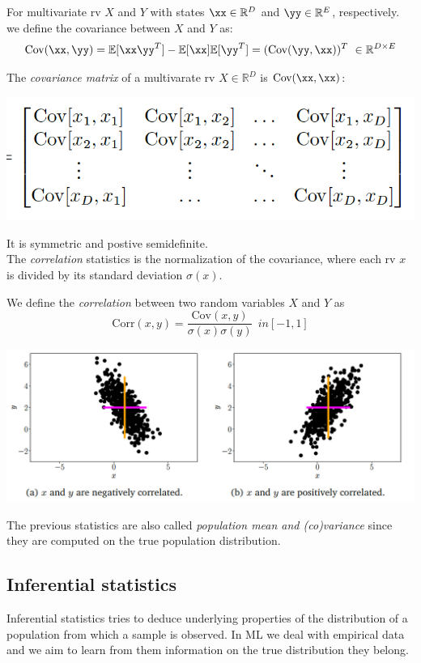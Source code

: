  For multivariate rv $X$ and $Y$ with states $\xx \in \mathbb{R}^D$ and $\yy \in \mathbb{R}^E$, respectively. we define the covariance between $X$ and $Y$ as:
 $$\text{Cov}(\xx, \yy) = \mathbb{E}[\xx\yy^T]-\mathbb{E}[\xx]\mathbb{E}[\yy^T]=(\text{Cov}(\yy, \xx))^T \ \in \mathbb{R}^{D \times E}$$
 
 The \textit{covariance matrix} of a multivarate rv $X \in \mathbb{R}^D$ is $\text{Cov}(\xx, \xx)$:
 
 \includegraphics[width=0.6 \textwidth]{sections/images/prob1.png}
 
 It is symmetric and postive semidefinite. \\
 The \textit{correlation} statistics is the normalization of the covariance, where each rv $x$ is divided by its standard deviation $\sigma(x)$.

 \begin{definition}
     We define the \textit{correlation} between two random variables $X$ and $Y$ as
     $$ \text{Corr}(x, y) = \frac{\text{Cov}(x, y)}{\sigma(x)\sigma(y)} \ \ in [-1,1]$$
 \end{definition}

\includegraphics[width=0.6 \textwidth]{sections/images/prob2.png}




The previous statistics are also called \textit{population mean and (co)variance} since they are computed on the true population distribution.

 \subsection{Inferential statistics}
 Inferential statistics tries to deduce underlying properties of the distribution of a population from which a sample is observed. In ML we deal with empirical data and we aim to learn from them information on the true distribution they belong. 
 
